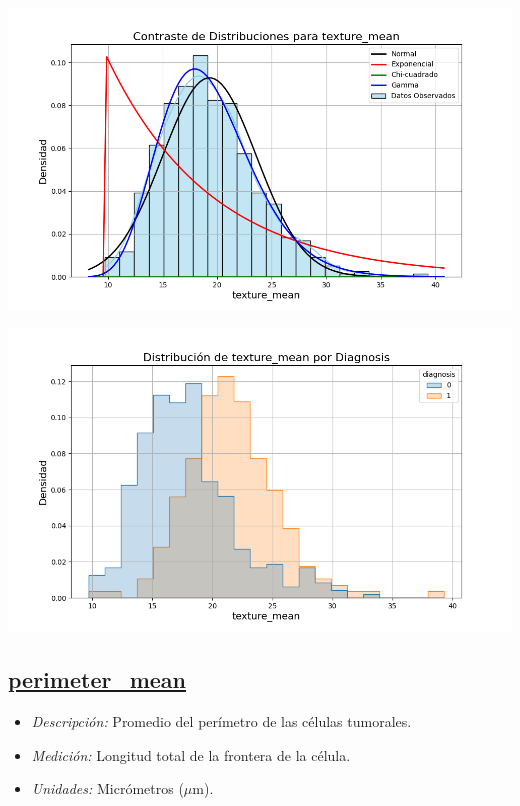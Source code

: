 \documentclass[a4paper, 12pt]{article}
\begin{document}
\includegraphics[width=\textwidth]{../Plots/plots_stats/texture_mean/distribuciones_conocidas_texture_mean.png}

\includegraphics[width=\textwidth]{../Plots/plots_diagnosis/distribucion_texture_mean_por_diagnosis.png}

\subsection*{\underline{perimeter\_mean}}

    \begin{itemize}
	\item \textit{Descripción:} Promedio del perímetro de las células tumorales.
	\item \textit{Medición:} Longitud total de la frontera de la célula.
	\item \textit{Unidades:} Micrómetros ($\mu$m).
\end{itemize}
\end{document}
